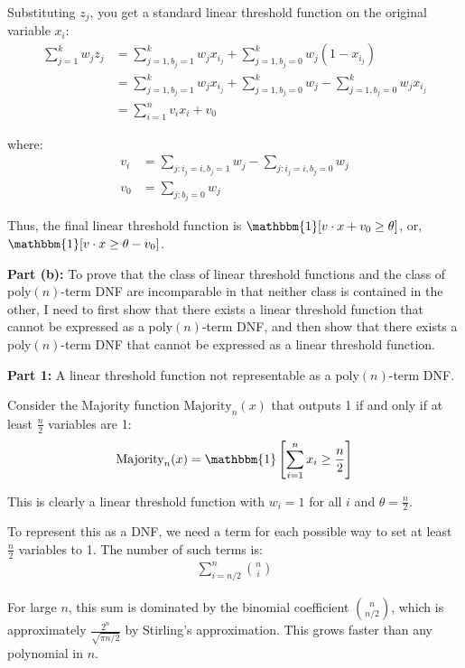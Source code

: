 \documentclass[11pt]{article}
\DeclareMathOperator{\1}{\mathbbm{1}}
\begin{document}
\begin{problem} [15 points]
Substituting $z_j$, you get a standard linear threshold function on the original variable $x_i$:
\begin{align}
	\sum_{j=1}^k w_j z_j &= \sum_{j=1, b_j=1}^k w_j x_{i_j} + \sum_{j=1, b_j=0}^k w_j (1-x_{i_j}) \\
	&= \sum_{j=1, b_j=1}^k w_j x_{i_j} + \sum_{j=1, b_j=0}^k w_j - \sum_{j=1, b_j=0}^k w_j x_{i_j} \\
	&= \sum_{i=1}^n v_i x_i + v_0
	\end{align}

where: 
\begin{align}
	v_i &= \sum_{j: i_j=i, b_j=1} w_j - \sum_{j: i_j=i, b_j=0} w_j \\
	v_0 &= \sum_{j: b_j=0} w_j
	\end{align}

Thus, the final linear threshold function is $\1[v \cdot x + v_0 \geq \theta]$, or, $\1[v \cdot x \geq \theta - v_0]$.

\textbf{Part (b):} To prove that the class of linear threshold functions and the class of poly$(n)$-term DNF are incomparable in that neither class is contained in the other, I need to first show that there exists a linear threshold function that cannot be expressed as a poly$(n)$-term DNF, and then show that there exists a poly$(n)$-term DNF that cannot be expressed as a linear threshold function.

\textbf{Part 1:} A linear threshold function not representable as a poly$(n)$-term DNF.

Consider the Majority function $\text{Majority}_n(x)$ that outputs 1 if and only if at least $\frac{n}{2}$ variables are 1:
\begin{align}
\text{Majority}_n(x) = \1\left[\sum_{i=1}^n x_i \geq \frac{n}{2}\right]
\end{align}

This is clearly a linear threshold function with $w_i = 1$ for all $i$ and $\theta = \frac{n}{2}$.

To represent this as a DNF, we need a term for each possible way to set at least $\frac{n}{2}$ variables to 1. The number of such terms is:
\begin{align}
\sum_{i=n/2}^n \binom{n}{i}
\end{align}

For large $n$, this sum is dominated by the binomial coefficient $\binom{n}{n/2}$, which is approximately $\frac{2^n}{\sqrt{\pi n/2}}$ by Stirling's approximation. This grows faster than any polynomial in $n$.


\end{problem}
\end{document}
